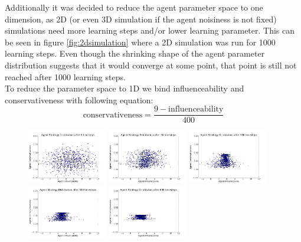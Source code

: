 \documentclass[11pt]{article}
\begin{document}
Additionally it was decided to reduce the agent parameter space to one dimension, as 2D (or even 3D simulation if the agent noisiness is not fixed) simulations need more learning steps and/or lower learning parameter. This can be seen in figure \ref{fig:2dsimulation} where a 2D simulation was run for 1000 learning steps. Even though the shrinking shape of the agent parameter distribution suggests that it would converge at some point, that point is still not reached after 1000 learning steps. \\
To reduce the parameter space to 1D we bind influenceability and conservativeness with following equation: 
\begin{equation}
  \text{conservativeness} = \frac{9 - \text{influenceability}}{400}
\end{equation}
\begin{figure}
  \centering
  \quad
  \includegraphics[width=0.31\textwidth]{figures/2dsim_1.png}
  \includegraphics[width=0.31\textwidth]{figures/2dsim_2.png}
  \includegraphics[width=0.31\textwidth]{figures/2dsim_3.png}
  \includegraphics[width=0.31\textwidth]{figures/2dsim_4.png}
  \includegraphics[width=0.31\textwidth]{figures/2dsim_5.png}

\end{figure}
\end{document}
